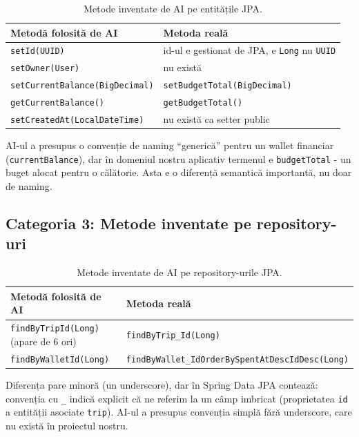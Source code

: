 \begin{table}[!htb]
\centering
\caption{Metode inventate de AI pe entitățile JPA.}
\label{tab:ai-methods}
\begin{tabularx}{\linewidth}{XX}
\toprule
\textbf{Metodă folosită de AI} & \textbf{Metoda reală} \\
\midrule
\texttt{setId(UUID)} & id-ul e gestionat de JPA, e \texttt{Long} nu \texttt{UUID} \\
\texttt{setOwner(User)} & nu există \\
\texttt{setCurrentBalance(BigDecimal)} & \texttt{setBudgetTotal(BigDecimal)} \\
\texttt{getCurrentBalance()} & \texttt{getBudgetTotal()} \\
\texttt{setCreatedAt(LocalDateTime)} & nu există ca setter public \\
\bottomrule
\end{tabularx}
\end{table}

AI-ul a presupus o convenție de naming \enquote{generică} pentru un wallet financiar (\texttt{currentBalance}), dar în domeniul nostru aplicativ termenul e \texttt{budgetTotal} - un buget alocat pentru o călătorie. Asta e o diferență semantică importantă, nu doar de naming.

\subsection{Categoria 3: Metode inventate pe repository-uri}

\begin{table}[!htb]
\centering
\caption{Metode inventate de AI pe repository-urile JPA.}
\label{tab:ai-repos}
\begin{tabularx}{\linewidth}{XX}
\toprule
\textbf{Metodă folosită de AI} & \textbf{Metoda reală} \\
\midrule
\texttt{findByTripId(Long)} (apare de 6 ori) & \texttt{findByTrip\_Id(Long)} \\
\texttt{findByWalletId(Long)} & \texttt{findByWallet\_IdOrderBySpentAtDescIdDesc(Long)} \\
\bottomrule
\end{tabularx}
\end{table}

Diferența pare minoră (un underscore), dar în Spring Data JPA contează: convenția cu \texttt{\_} indică explicit că ne referim la un câmp imbricat (proprietatea \texttt{id} a entității asociate \texttt{trip}). AI-ul a presupus convenția simplă fără underscore, care nu există în proiectul nostru.

